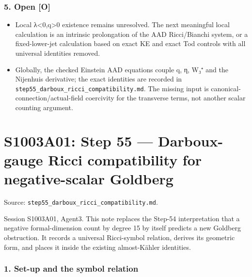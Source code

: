 \documentclass[
  10pt,
]{report}
\providecommand{\tightlist}{%
  \setlength{\itemsep}{0pt}\setlength{\parskip}{0pt}}
\begin{document}
\hypertarget{open-o}{%
\subsection{5. Open {[}O{]}}\label{open-o}}

\begin{itemize}
\tightlist
\item
  Local λ\textless0,q\textgreater0 existence remains unresolved. The
  next meaningful local calculation is an intrinsic prolongation of the
  AAD Ricci/Bianchi system, or a fixed-lower-jet calculation based on
  exact KE and exact Tod controls with all universal identities removed.
\item
  Globally, the checked Einstein AAD equations couple q, η, W₃⁺ and the
  Nijenhuis derivative; the exact identities are recorded in
  \texttt{step55\_darboux\_ricci\_compatibility.md}. The missing input
  is canonical-connection/actual-field coercivity for the transverse
  terms, not another scalar counting argument.
\end{itemize}

\hypertarget{s1003a01-step-55-darboux-gauge-ricci-compatibility-for-negative-scalar-goldberg}{%
\chapter{S1003A01: Step 55 --- Darboux-gauge Ricci compatibility for
negative-scalar
Goldberg}\label{s1003a01-step-55-darboux-gauge-ricci-compatibility-for-negative-scalar-goldberg}}

Source: \texttt{step55\_darboux\_ricci\_compatibility.md}.

Session S1003A01, Agent3. This note replaces the Step-54 interpretation
that a negative formal-dimension count by degree 15 by itself predicts a
new Goldberg obstruction. It records a universal Ricci-symbol relation,
derives its geometric form, and places it inside the existing
almost-Kähler identities.

\hypertarget{set-up-and-the-symbol-relation}{%
\subsection{1. Set-up and the symbol
relation}\label{set-up-and-the-symbol-relation}}
\end{document}
